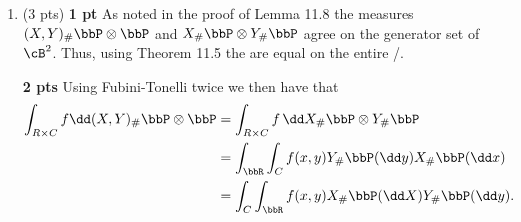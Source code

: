 \begin{enumerate}[label={(\alph*)}]
Thus, the result follows if we can show that 
\[
	[(X,Y)\mathbbm{1}_{\Omega \times B}]_\# \bbP \otimes \bbP = [(X,Y)\circ \Delta \mathbbm{1}_B]_\# \bbP 
\]
as measures on $\cB^2 = \cB \otimes \cB$. 

\textbf{1 pt}
Since both measure are finite it follows from Theorem 2.15 that is suffices to check equality on the generator set $\cB \times \cB$.

\textbf{2 pts}
To this end, let $C, D \in \cB$. Then it holds that
\begin{align*}
	[(X,Y)\circ \Delta \mathbbm{1}_B]^{-1}(C \times D) 
	&= \{\omega \in \Omega \, : \, \omega \in B, X(\omega) \in C, Y(\omega) \in D\}\\
	&= X^{-1}(C) \cap Y^{-1}(D) \cap B.
\end{align*}
Recall that $B \in \sigma(Y)$ so that also $Y^{-1}(D) \cap B \in \sigma(Y)$. Thus, since $X$ and $Y$ are independent
\begin{align*}
	[(X,Y)\circ \Delta \mathbbm{1}_B]_\# \bbP(C \times D) 
	&= \bbP(X^{-1}(C) \cap Y^{-1}(D) \cap B) \\
	&= \bbP(X^{-1}(C)) \bbP(Y^{-1}(D) \cap B).
\end{align*}

\textbf{2 pts}
On the other hand, since
\[
	[(X,Y)\mathbbm{1}_{\Omega \times B}]^{-1}(C \times D) = X^{-1}(C) \times Y^{-1}(D) \cap B,
\]
we have that
\begin{align*}
	[(X,Y)\mathbbm{1}_{\Omega \times B}]_\# \bbP \otimes \bbP(C \times D)
	&= \bbP \otimes \bbP(X^{-1}(C) \times Y^{-1}(D) \cap B) \\
	&= \bbP(X^{-1}(C)) \bbP(Y^{-1}(D) \cap B). 
\end{align*}

We therefore conclude that both measures are equal on the generator set of $\cB^2$ and hence are equal on the entire \sigalg/.
\item (3 pts)
\textbf{1 pt} As noted in the proof of Lemma 11.8 the measures $(X, Y)_\# \bbP \otimes \bbP$ and $X_\# \bbP \otimes Y_\# \bbP$ agree on the generator set of $\cB^2$. Thus, using Theorem 11.5 the are equal on the entire \sigalg/. 

\textbf{2 pts} Using Fubini-Tonelli twice we then have that
\begin{align*}
	\int_{R \times C} f \dd (X, Y)_\# \bbP \otimes \bbP 
	&= \int_{R \times C} f \, \dd X_\# \bbP \otimes Y_\# \bbP\\
	&= \int_\bbR \int_C f(x,y) Y_\# \bbP(\dd y)  X_\#\bbP(\dd x) \\
	&= \int_C \int_\bbR f(x,y) X_\# \bbP(\dd X) Y_\# \bbP(\dd y).
\end{align*}

\end{enumerate}


